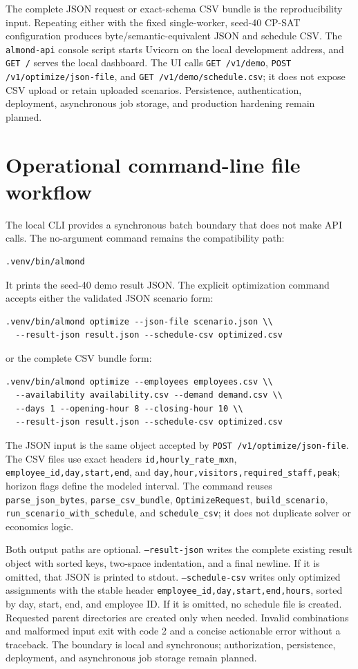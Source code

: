 \documentclass[11pt,a4paper]{article}
\begin{document}
The complete JSON request or exact-schema CSV bundle is the reproducibility input. Repeating either with the fixed single-worker, seed-40 CP-SAT configuration produces byte/semantic-equivalent JSON and schedule CSV. The \texttt{almond-api} console script starts Uvicorn on the local development address, and \texttt{GET /} serves the local dashboard. The UI calls \texttt{GET /v1/demo}, \texttt{POST /v1/optimize/json-file}, and \texttt{GET /v1/demo/schedule.csv}; it does not expose CSV upload or retain uploaded scenarios. Persistence, authentication, deployment, asynchronous job storage, and production hardening remain planned.

\section{Operational command-line file workflow}
The local CLI provides a synchronous batch boundary that does not make API calls. The no-argument command remains the compatibility path:
\begin{verbatim}
.venv/bin/almond
\end{verbatim}
It prints the seed-40 demo result JSON. The explicit optimization command accepts either the validated JSON scenario form:
\begin{verbatim}
.venv/bin/almond optimize --json-file scenario.json \\
  --result-json result.json --schedule-csv optimized.csv
\end{verbatim}
or the complete CSV bundle form:
\begin{verbatim}
.venv/bin/almond optimize --employees employees.csv \\
  --availability availability.csv --demand demand.csv \\
  --days 1 --opening-hour 8 --closing-hour 10 \\
  --result-json result.json --schedule-csv optimized.csv
\end{verbatim}
The JSON input is the same object accepted by \texttt{POST /v1/optimize/json-file}. The CSV files use exact headers \texttt{id,hourly\_rate\_mxn}, \texttt{employee\_id,day,start,end}, and \texttt{day,hour,visitors,required\_staff,peak}; horizon flags define the modeled interval. The command reuses \texttt{parse\_json\_bytes}, \texttt{parse\_csv\_bundle}, \texttt{OptimizeRequest}, \texttt{build\_scenario}, \texttt{run\_scenario\_with\_schedule}, and \texttt{schedule\_csv}; it does not duplicate solver or economics logic.

Both output paths are optional. \texttt{--result-json} writes the complete existing result object with sorted keys, two-space indentation, and a final newline. If it is omitted, that JSON is printed to stdout. \texttt{--schedule-csv} writes only optimized assignments with the stable header \texttt{employee\_id,day,start,end,hours}, sorted by day, start, end, and employee ID. If it is omitted, no schedule file is created. Requested parent directories are created only when needed. Invalid combinations and malformed input exit with code 2 and a concise actionable error without a traceback. The boundary is local and synchronous; authorization, persistence, deployment, and asynchronous job storage remain planned.
\end{document}
